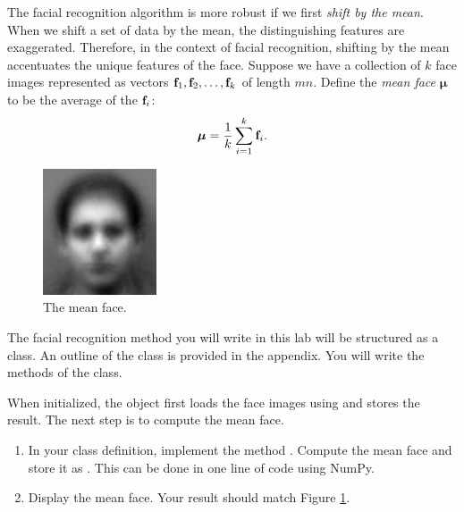 The facial recognition algorithm is more robust if we first \emph{shift by the mean}. When we shift a set of data by the mean, the distinguishing features are exaggerated. Therefore, in the context of facial recognition, shifting by the mean accentuates the unique features of the face.
Suppose we have a collection of $k$ face images represented as vectors $\mathbf{f}_1, \mathbf{f}_2, \ldots, \mathbf{f}_k$ of length $mn$.
Define the \emph{mean face} ${\boldsymbol \mu}$ to be the average of the $\mathbf{f}_i$:
\[
{\boldsymbol \mu} = \frac{1}{k}\sum_{i=1}^k \mathbf{f}_i.
\]
\begin{figure}
\includegraphics[width=0.3\textwidth]{figures/meanFace.png}
\caption{The mean face.}
\label{facialRecognition:meanFace}
\end{figure}

\begin{problem}
\label{prob:meanFace}
\leavevmode

The facial recognition method you will write in this lab will be structured as a class.
An outline of the  class is provided in the appendix. %
You will write the methods of the class.

When initialized, the  object first loads the face images using  and stores the result.
The next step is to compute the mean face.
\begin{enumerate}
\item In your class definition, implement the method .
Compute the mean face and store it as .
This can be done in one line of code using NumPy.

\item Display the mean face.
Your result should match Figure \ref{facialRecognition:meanFace}.
\end{enumerate}
\end{problem}

